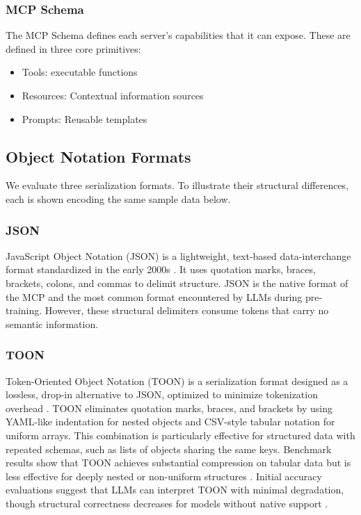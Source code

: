 \documentclass[10pt,twocolumn,letterpaper]{article}
\begin{document}
\subsubsection{MCP Schema}
The MCP Schema defines each server's capabilities that it can expose. These are defined in three core primitives:
\begin{itemize}
    \item Tools: executable functions
    \item Resources: Contextual information sources
    \item Prompts: Reusable templates
\end{itemize}

\subsection{Object Notation Formats}

We evaluate three serialization formats. To illustrate their structural differences, each is shown encoding the same sample data below.

\subsubsection{JSON}

JavaScript Object Notation (JSON) is a lightweight, text-based data-interchange format standardized in the early 2000s \citep{Bourhis_Reutter_Suárez_Vrgoč_2017}. It uses quotation marks, braces, brackets, colons, and commas to delimit structure. JSON is the native format of the MCP and the most common format encountered by LLMs during pre-training. However, these structural delimiters consume tokens that carry no semantic information.

\subsubsection{TOON}

Token-Oriented Object Notation (TOON) is a serialization format designed as a lossless, drop-in alternative to JSON, optimized to minimize tokenization overhead \citep{toon-format/toon_2026, Lafalce_2025}. TOON eliminates quotation marks, braces, and brackets by using YAML-like indentation for nested objects and CSV-style tabular notation for uniform arrays. This combination is particularly effective for structured data with repeated schemas, such as lists of objects sharing the same keys. Benchmark results show that TOON achieves substantial compression on tabular data but is less effective for deeply nested or non-uniform structures \citep{Lafalce_2025}. Initial accuracy evaluations suggest that LLMs can interpret TOON with minimal degradation, though structural correctness decreases for models without native support \citep{Masciari_Moscato_Napolitano_Orlando_Perillo_Russo_2026}.
\end{document}
